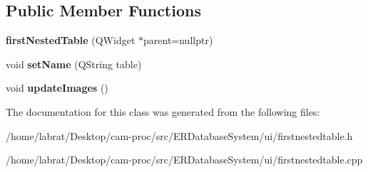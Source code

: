 \subsection*{Public Member Functions}
\begin{DoxyCompactItemize}
\item 
{\bfseries first\+Nested\+Table} (Q\+Widget $\ast$parent=nullptr)\hypertarget{classfirstNestedTable_a8eeeb1d32c3e24a6c028c4dd374df3b6}{}\label{classfirstNestedTable_a8eeeb1d32c3e24a6c028c4dd374df3b6}

\item 
void {\bfseries set\+Name} (Q\+String table)\hypertarget{classfirstNestedTable_adcd2612cb8f46d9c223b7d89f08286e6}{}\label{classfirstNestedTable_adcd2612cb8f46d9c223b7d89f08286e6}

\item 
void {\bfseries update\+Images} ()\hypertarget{classfirstNestedTable_ac1625ffee7e65e0b168b642326353ad2}{}\label{classfirstNestedTable_ac1625ffee7e65e0b168b642326353ad2}

\end{DoxyCompactItemize}


The documentation for this class was generated from the following files\+:\begin{DoxyCompactItemize}
\item 
/home/labrat/\+Desktop/cam-\/proc/src/\+E\+R\+Database\+System/ui/firstnestedtable.\+h\item 
/home/labrat/\+Desktop/cam-\/proc/src/\+E\+R\+Database\+System/ui/firstnestedtable.\+cpp\end{DoxyCompactItemize}
